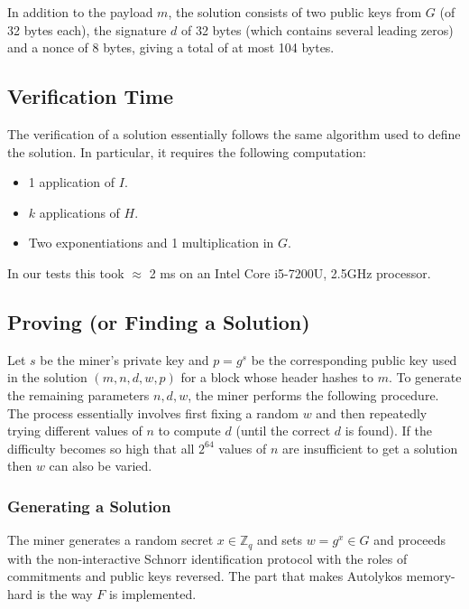 \documentclass[11pt]{article}
\newcommand{\powname}{Autolykos\xspace}
\begin{document}
In addition to the payload $m$, the solution consists of two public keys from $G$ (of 32 bytes each), the signature $d$ of 32 bytes (which contains several leading zeros) and a nonce of 8 bytes, giving a total of at most 104 bytes. 

\subsection{Verification Time}
\label{verify}

The verification of a solution essentially follows the same algorithm used to define the solution. In particular, it requires the following computation:
\begin{itemize}
	\item 1 application of $I$.
	\item $k$ applications of $H$.
	\item Two exponentiations and 1 multiplication in $G$.
\end{itemize}
In our tests this took $\approx$ 2 ms on an Intel Core i5-7200U, 2.5GHz processor.

\subsection{Proving (or Finding a Solution)}
\label{generating}

Let ${s}$ be the miner's private key and ${p} = g^{s}$ be the corresponding public key used in the solution $(m, n, d, w, p)$ for a block whose header hashes to $m$. To generate the remaining parameters $n, d, w$, the miner performs the following procedure. The process essentially involves first fixing a random $w$ and then repeatedly trying different values of $n$ to compute $d$ (until the correct $d$ is found). If the difficulty becomes so high that all $2^{64}$ values of $n$ are insufficient to get a solution then $w$ can also be varied.

\subsubsection{Generating a Solution}

The miner generates a random secret $x\in \mathbb{Z}_q$ and sets $w = g^x\in G$ and proceeds with the non-interactive Schnorr identification protocol with the roles of commitments and public keys reversed. 
The part that makes \powname memory-hard is the way $F$ is implemented. 
\end{document}
